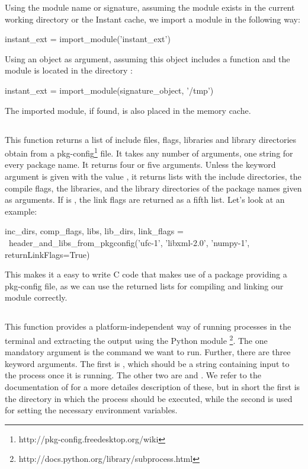 Using the module name or signature, assuming the module 
exists in the current working directory or the Instant cache, we import a
module in the following way:
\begin{code}
instant_ext = import_module('instant_ext')
\end{code}
Using an object as argument, assuming this object includes a
function  and the module is located in the
directory :
\begin{code}
instant_ext = import_module(signature_object, '/tmp')
\end{code}
The imported module, if found, is also placed in the memory cache.


\subsection[header\_and\_libs\_from\_pkgconfig]{}
This function returns a list of include files, flags, libraries and library
directories obtain from a
pkg-config\footnote{http://pkg-config.freedesktop.org/wiki} file. It takes any
number of arguments, one string for every package name. 
It returns four or five arguments. Unless the keyword
argument  is given with the value , it returns
lists with the include directories, the compile flags, the libraries, and the library
directories of the package names given as arguments. If 
is , the link flags are returned as a fifth list. Let's look at an
example:
\begin{code}
inc_dirs, comp_flags, libs, lib_dirs, link_flags = \
header_and_libs_from_pkgconfig('ufc-1', 'libxml-2.0', 'numpy-1', 
                               returnLinkFlags=True)
\end{code}
This makes it a easy to write C code that makes use of a package providing a
pkg-config file, as we can use the returned lists for compiling and linking
our module correctly.

\subsection[get\_status\_output]{}
This function provides a platform-independent way of running processes in the
terminal and extracting the output using the Python
module \footnote{http://docs.python.org/library/subprocess.html}. The
one mandatory argument is the command we want to run. Further, there are three
keyword arguments. The first is \emp{input}, which should be a string
containing input to the process once it is running. The other two
are \emp{cwd} and \emp{env}. We refer to the documentation of 
for a more detailes description of these, but in short the first is the
directory in which the process should be executed, while the second is used
for setting the necessary environment variables.

